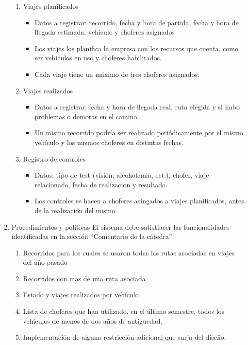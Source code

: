 \begin{enumerate}
  \begin{enumerate}[label=\Roman{*}]
  \item Viajes planificados
    \begin{itemize}
      \item Datos a registrar: recorrido, fecha y hora de partida, fecha y hora de llegada estimada, veh\'iculo y choferes asignados
      \item Los viajes los planifica la empresa con los recursos que cuenta, como ser veh\'iculos en uso y choferes habilitados. 
      \item Cada viaje tiene un m\'aximo de tres choferes asignados.
    \end{itemize}  
  \item Viajes realizados
    \begin{itemize}
      \item Datos a registrar: fecha y hora de llegada real, ruta elegida y si hubo problemas o demoras en el camino.
      \item Un mismo recorrido podría ser realizado periódicamente por el mismo vehículo y los mismos choferes en distintas fechas.
    \end{itemize}  
  \item Registro de controles
    \begin{itemize}
      \item Datos: tipo de test (visi\'on, alcoholemia, ect.), chofer, viaje relacionado, fecha de realizacion y resultado.
      \item Los controles se hacen a choferes asingados a viajes planificados, antes de la realizaci\'on del mismo.
    \end{itemize}  
  \end{enumerate}
\item Procedimientos y pol\'iticas
  El sistema debe satistfacer las funcionalidades identificadas en la secci\'on ``Comentario de la c\'atedra''
  \begin{enumerate}[label=\Roman{*}]
  \item Recorridos para los cuales se usaron todas las rutas asociadas en viajes del a\~no pasado
  \item Recorridos con mas de una ruta asociada
  \item Estado y viajes realizados por veh\'iculo
  \item Lista de choferes que han utilizado, en el \'ultimo semestre, todos los veh\'iculos de menos de dos a\~nos de antiguedad.
  \item Implementaci\'on de alguna restricci\'on adicional que surja del dise\~no.
  \end{enumerate}
\end{enumerate}
